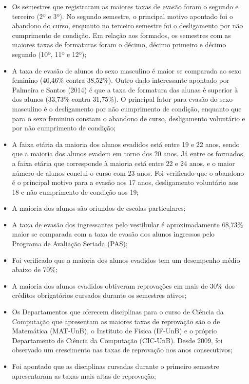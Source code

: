 \begin{itemize}
\item Os semestres que registraram as maiores taxas de evasão foram o segundo e terceiro (2º e 3º). No segundo semestre, o principal motivo apontado foi o abandono do curso, enquanto no terceiro semestre foi o desligamento por não cumprimento de condição. Em relação aos formados, os semestres com as maiores taxas de formaturas foram o décimo, décimo primeiro e décimo segundo (10º, 11º e 12º);
\item A taxa de evasão de alunos do sexo masculino é maior se comparada ao sexo feminino (40,46\% contra 38,52\%). Outro dado interessante apontado por Palmeira e Santos (2014) é que a taxa de formatura das alunas é superior à dos alunos (33,73\% contra 31,75\%). O principal fator para evasão do sexo masculino é o desligamento por não cumprimento de condição, enquanto que para o sexo feminino constam o abandono de curso, desligamento voluntário e por não cumprimento de condição;
\item A faixa etária da maioria dos alunos evadidos está entre 19 e 22 anos, sendo que a maioria dos alunos evadem em torno dos 20 anos. Já entre os formados, a faixa etária que corresponde à maioria está entre 22 e 24 anos, e o maior número de alunos conclui o curso com 23 anos. Foi verificado que o abandono é o principal motivo para a evasão aos 17 anos, desligamento voluntário aos 18 e não cumprimento de condição aos 19;
\item A maioria dos alunos são oriundos de escolas particulares;
\item A taxa de evasão dos ingressantes pelo vestibular é aproximadamente 68,73\% maior se comparada com a taxa de evasão dos alunos ingressos pelo Programa de Avaliação Seriada (PAS);
\item Foi verificado que a maioria dos alunos evadidos tem um desempenho médio abaixo de 70\%;
\item A maioria dos alunos evadidos obtiveram reprovações em mais de 30\% dos créditos obrigatórios cursados durante os semestres ativos;
\item Os Departamentos que oferecem disciplinas para o curso de Ciência da Computação que apresentam as maiores taxas de reprovação são o de Matemática (MAT-UnB), o Instituto de Física (IF-UnB) e o próprio Departamento de Ciência da Computação (CIC-UnB). Desde 2009, foi observado um crescimento nas taxas de reprovação nos anos consecutivos;
\item Foi apontado que as disciplinas cursadas durante o primeiro semestre  apresentaram as taxas mais altas de reprovação;

\end{itemize}
